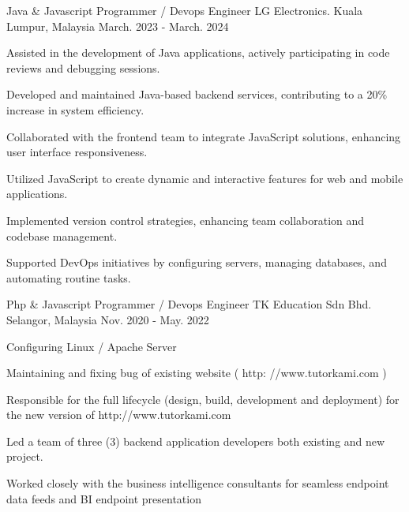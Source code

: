 

\begin{cventries}

  \cventry
    {Java \& Javascript Programmer / Devops Engineer} %
    {LG Electronics.} %
    {Kuala Lumpur, Malaysia} %
    {March. 2023 - March. 2024} %
    {
      \begin{cvitems} %
      \item Assisted in the development of Java applications, actively participating in code reviews and debugging sessions.
      \item Developed and maintained Java-based backend services, contributing to a 20\% increase in system efficiency.
      \item Collaborated with the frontend team to integrate JavaScript solutions, enhancing user interface responsiveness.
      \item Utilized JavaScript to create dynamic and interactive features for web and mobile applications.
      \item Implemented version control strategies, enhancing team collaboration and codebase management.
      \item Supported DevOps initiatives by configuring servers, managing databases, and automating routine tasks.
      \end{cvitems}
    }

  \cventry
    {Php \& Javascript Programmer / Devops Engineer} %
    {TK Education Sdn Bhd.} %
    {Selangor, Malaysia} %
    {Nov. 2020 - May. 2022} %
    {
      \begin{cvitems} %
      	\item Configuring Linux / Apache Server
      	\item Maintaining and fixing bug of existing website ( http: //www.tutorkami.com )
      	\item Responsible for the full lifecycle (design, build, development and deployment) for the new version of http://www.tutorkami.com
      	\item Led a team of three (3) backend application developers both existing and new project.
      	\item Worked closely with the business intelligence consultants for seamless endpoint data feeds and BI endpoint presentation
      \end{cvitems}
    }


\end{cventries}
